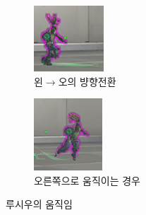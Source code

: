 \begin{figure}[htp]
\begin{subfigure}[b]{0.3\textwidth}
             \includegraphics[width=\textwidth]{figures/read_moving/l2r.png}
             \caption{왼$\rightarrow$오의 뱡향전환}
             \label{fig:1-b}
         \end{subfigure}
         \hfill
         \begin{subfigure}[b]{0.3\textwidth}
             \centering
             \includegraphics[width=\textwidth]{figures/read_moving/right.png}
             \caption{오른쪽으로 움직이는 경우}
             \label{fig:1-c}
         \end{subfigure}
            \caption{루시우의 움직임}
            \label{fig:read_moving}
    \end{figure}
